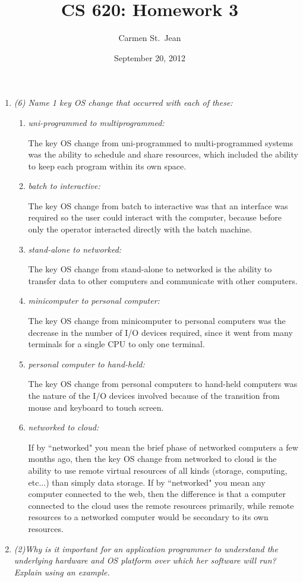 \documentclass[letterpaper,11pt]{article}
\begin{document}
\title{CS 620: Homework 3}
\date{September 20, 2012}
\author{Carmen St.\ Jean}

\maketitle

\begin{enumerate}
  \item \emph{(6) Name 1 key OS change that occurred with each of these:}
  \begin{enumerate}
    \item \emph{uni-programmed to multiprogrammed:}

    The key OS change from uni-programmed to multi-programmed systems was the ability to schedule and share resources, which included the ability to keep each program within its own space.
    \item \emph{batch to interactive:}

    The key OS change from batch to interactive was that an interface was required so the user could interact with the computer, because before only the operator interacted directly with the batch machine.
    \item \emph{stand-alone to networked:}

    The key OS change from stand-alone to networked is the ability to transfer data to other computers and communicate with other computers.
    \item \emph{minicomputer to personal computer:}

    The key OS change from minicomputer to personal computers was the decrease in the number of I/O devices required, since it went from many terminals for a single CPU to only one terminal.
    \item \emph{personal computer to hand-held:}

    The key OS change from personal computers to hand-held computers was the nature of the I/O devices involved because of the transition from mouse and keyboard to touch screen.
    \item \emph{networked to cloud:}

    If by ``networked" you mean the brief phase of networked computers a few months ago, then the key OS change from networked to cloud is the ability to use remote virtual resources of all kinds (storage, computing, etc...) than simply data storage.  If by ``networked" you mean any computer connected to the web, then the difference is that a computer connected to the cloud uses the remote resources primarily, while remote resources to a networked computer would be secondary to its own resources.
  \end{enumerate}
  \item \emph{(2)Why is it important for an application programmer to understand the underlying hardware and OS platform over which her software will run? Explain using an example.}


\end{enumerate}
\end{document}
